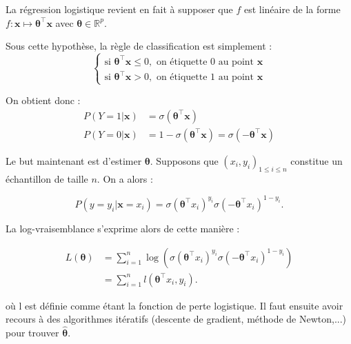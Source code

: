 \documentclass{article}
\begin{document}
La régression logistique revient en fait à supposer que \( f \) est linéaire de la forme \( f : \bm{x} \mapsto \bm{\theta}^\top \bm{x} \) avec \( \bm{\theta} \in \mathbb{R}^p \).


Sous cette hypothèse, la règle de classification est simplement :
\[
\begin{cases}
\text{si } \bm{\theta}^\top \bm{x}\leq 0 , \text{ on étiquette 0 au point } \bm{x} \\
\text{si } \bm{\theta}^\top \bm{x} > 0, \text{ on étiquette 1 au point } \bm{x}
\end{cases}
\]

On obtient donc :
\begin{align*}
    P(Y=1|\bm{x}) &= \sigma(\bm{\theta}^\top \bm{x}) \\
    P(Y=0|\bm{x}) &= 1- \sigma(\bm{\theta}^\top \bm{x}) = \sigma(-\bm{\theta}^\top \bm{x})
\end{align*}

Le but maintenant est d'estimer $\bm{\theta}$. Supposons que $(x_i, y_i)_{1 \leq i \leq n}$ constitue un échantillon de taille $n$. On a alors :

\[ P(y = y_i | \bm{x} = x_i) = \sigma(\bm{\theta}^\top x_i)^{y_i} \sigma(-\bm{\theta}^\top x_i)^{1-y_i}. \]

La log-vraisemblance s'exprime alors de cette manière :

\begin{align*}
    L(\bm{\theta}) &= \sum_{i=1}^{n} \log\left( \sigma(\bm{\theta}^\top x_i)^{y_i} \sigma(-\bm{\theta}^\top x_i)^{1-y_i} \right) \\
                   &= \sum_{i=1}^{n} l(\bm{\theta}^\top x_i, y_i).
\end{align*}

où l est définie comme étant la fonction de perte logistique. Il faut ensuite  avoir recours à des algorithmes itératifs (descente de gradient, méthode de Newton,...) pour trouver  $\bm{\hat{\theta}}$.
\end{document}
